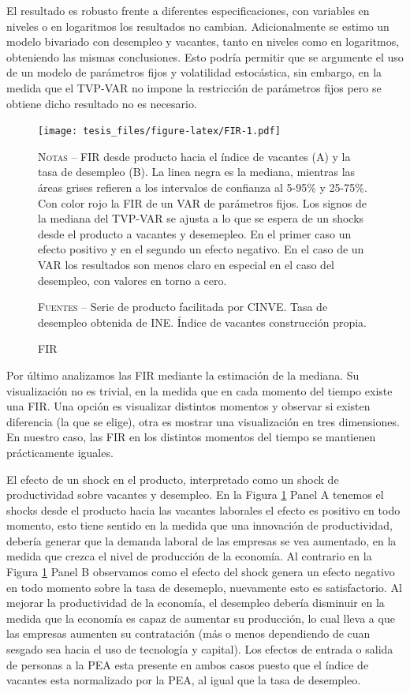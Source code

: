 \documentclass[12pt,oneside]{reedthesis}
\begin{document}
El resultado es robusto frente a diferentes especificaciones, con variables en niveles o en logaritmos los resultados no cambian. Adicionalmente se estimo un modelo bivariado con desempleo y vacantes, tanto en niveles como en logaritmos, obteniendo las mismas conclusiones. Esto podría permitir que se argumente el uso de un modelo de parámetros fijos y volatilidad estocástica, sin embargo, en la medida que el TVP-VAR no impone la restricción de parámetros fijos pero se obtiene dicho resultado no es necesario.
\begin{figure}
\texttt{[image: tesis\_files/figure-latex/FIR-1.pdf]}
\caption{FIR}\label{fig:FIR}\textsc{}

\footnotesize\textsc{Notas} -- FIR desde producto hacia el índice de vacantes (A) y la tasa de desempleo (B). La linea negra es la mediana, mientras las áreas grises refieren a los intervalos de confianza al 5-95\% y 25-75\%. Con color rojo la FIR de un VAR de parámetros fijos. Los signos de la mediana del TVP-VAR se ajusta a lo que se espera de un shocks desde el producto a vacantes y desemepleo. En el primer caso un efecto positivo y en el segundo un efecto negativo. En el caso de un VAR los resultados son menos claro en especial en el caso del desempleo, con valores en torno a cero.

\textsc{Fuentes} -- Serie de producto facilitada por CINVE. Tasa de desempleo obtenida de INE. Índice de vacantes construcción propia.
\end{figure}
Por último analizamos las FIR mediante la estimación de la mediana. Su visualización no es trivial, en la medida que en cada momento del tiempo existe una FIR. Una opción es visualizar distintos momentos y observar si existen diferencia (la que se elige), otra es mostrar una visualización en tres dimensiones. En nuestro caso, las FIR en los distintos momentos del tiempo se mantienen prácticamente iguales.

El efecto de un shock en el producto, interpretado como un shock de productividad sobre vacantes y desempleo. En la Figura \ref{fig:FIR} Panel A tenemos el shocks desde el producto hacia las vacantes laborales el efecto es positivo en todo momento, esto tiene sentido en la medida que una innovación de productividad, debería generar que la demanda laboral de las empresas se vea aumentado, en la medida que crezca el nivel de producción de la economía. Al contrario en la Figura \ref{fig:FIR} Panel B observamos como el efecto del shock genera un efecto negativo en todo momento sobre la tasa de desemeplo, nuevamente esto es satisfactorio. Al mejorar la productividad de la economía, el desempleo debería disminuir en la medida que la economía es capaz de aumentar su producción, lo cual lleva a que las empresas aumenten su contratación (más o menos dependiendo de cuan sesgado sea hacia el uso de tecnología y capital). Los efectos de entrada o salida de personas a la PEA esta presente en ambos casos puesto que el índice de vacantes esta normalizado por la PEA, al igual que la tasa de desempleo.
\end{document}
